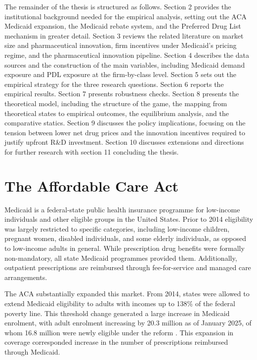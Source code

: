 \documentclass[12pt]{article}
\begin{document}
The remainder of the thesis is structured as follows. Section 2 provides the institutional background needed for the empirical analysis, setting out the ACA Medicaid expansion, the Medicaid rebate system, and the Preferred Drug List mechanism in greater detail. Section 3 reviews the related literature on market size and pharmaceutical innovation, firm incentives under Medicaid's pricing regime, and the pharmaceutical innovation pipeline. Section 4 describes the data sources and the construction of the main variables, including Medicaid demand exposure and PDL exposure at the firm-by-class level. Section 5 sets out the empirical strategy for the three research questions. Section 6 reports the empirical results. Section 7 presents robustness checks. Section 8 presents the theoretical model, including the structure of the game, the mapping from theoretical states to empirical outcomes, the equilibrium analysis, and the comparative statics. Section 9 discusses the policy implications, focusing on the tension between lower net drug prices and the innovation incentives required to justify upfront R\&D investment. Section 10 discusses extensions and directions for further research with section 11 concluding the thesis.

\clearpage

\section{The Affordable Care Act} \label{sec:ACA_section}

Medicaid is a federal-state public health insurance programme for low-income individuals and other eligible groups in the United States. Prior to 2014 eligibility was largely restricted to specific categories, including low-income children, pregnant women, disabled individuals, and some elderly individuals, as opposed to low-income adults in general. While prescription drug benefits were formally non-mandatory, all state Medicaid programmes provided them. Additionally, outpatient prescriptions are reimbursed through fee-for-service and managed care arrangements.

The ACA substantially expanded this market. From 2014, states were allowed to extend Medicaid eligibility to adults with incomes up to 138\% of the federal poverty line. This threshold change generated a large increase in Medicaid enrolment, with adult enrolment increasing by 20.3 million as of January 2025, of whom 16.8 million were newly eligible under the reform \citet{kff2026medicaidexpansion}. This expansion in coverage corresponded increase in the number of prescriptions reimbursed through Medicaid.
\end{document}
